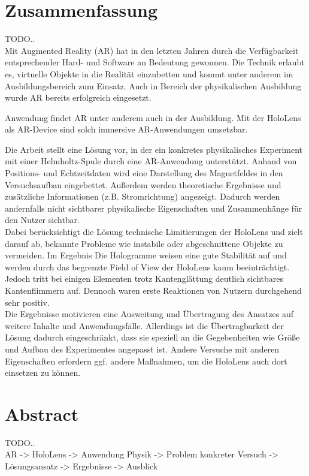 \section*{Zusammenfassung}
TODO..\\
Mit Augmented Reality (AR) hat in den letzten Jahren durch die Verfügbarkeit entsprechender Hard- und Software an Bedeutung gewonnen. Die Technik erlaubt es, virtuelle Objekte in die Realität einzubetten und kommt unter anderem im Ausbildungsbereich zum Einsatz. Auch in Bereich der physikalischen Ausbildung wurde AR bereits erfolgreich eingesetzt. 

Anwendung findet AR unter anderem auch in der Ausbildung. Mit der HoloLens als AR-Device sind solch immersive AR-Anwendungen umsetzbar. 

Die Arbeit stellt eine Lösung vor, in der ein konkretes physikalisches Experiment mit einer Helmholtz-Spule durch eine AR-Anwendung unterstützt. Anhand von Positions- und Echtzeitdaten wird eine Darstellung des Magnetfeldes in den Versuchsaufbau eingebettet. Außerdem werden theoretische Ergebnisse und zusätzliche Informationen (z.B. Stromrichtung) angezeigt. Dadurch werden andernfalls nicht sichtbarer physikalische Eigenschaften und Zusammenhänge für den Nutzer sichtbar.\\

\noindent\hspace*{5mm}
Dabei berücksichtigt die Lösung technische Limitierungen der HoloLens und zielt darauf ab, bekannte Probleme wie instabile oder abgeschnittene Objekte zu vermeiden. Im Ergebnis Die Hologramme weisen eine gute Stabilität auf und werden durch das begrenzte Field of View der HoloLens kaum beeinträchtigt. Jedoch tritt bei einigen Elementen trotz Kantenglättung deutlich sichtbares Kantenflimmern auf. Dennoch waren erste Reaktionen von Nutzern durchgehend sehr positiv.\\

\noindent\hspace*{5mm}
Die Ergebnisse motivieren eine Ausweitung und Übertragung des Ansatzes auf weitere Inhalte und Anwendungsfälle. Allerdings ist die Übertragbarkeit der Lösung dadurch eingeschränkt, dass sie speziell an die Gegebenheiten wie Größe und Aufbau des Experimentes angepasst ist. Andere Versuche mit anderen Eigenschaften erfordern ggf. andere Maßnahmen, um die HoloLens auch dort einsetzen zu können.

\section*{Abstract}
TODO..\\
AR -> HoloLens -> Anwendung Physik -> Problem konkreter Versuch -> Lösungsansatz -> Ergebnisse -> Ausblick